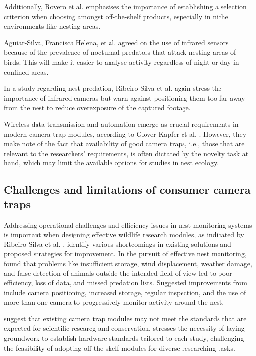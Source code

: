 \documentclass[class=report,11pt,crop=false]{standalone}
\begin{document}
Additionally, Rovero et al. \cite{rovero2013which} emphasises the importance of establishing a selection criterion when choosing amongst off-the-shelf products, especially in niche environments like nesting areas.

Aguiar-Silva, Francisca Helena, et al. \cite{aguiar-silva2017camera} agreed on the use of infrared sensors because of the prevalence of nocturnal predators that attack nesting areas of birds. This will make it easier to analyse activity regardless of night or day in confined areas.

In a study regarding nest predation, Ribeiro-Silva et al. \cite{ribeiro-silva2018testing} again stress the importance of infrared cameras but warn against positioning them too far away from the nest to reduce overexposure of the captured footage.

Wireless data transmission and automation emerge as crucial requirements in modern camera trap modules, according to Glover-Kapfer et al. \cite{glover2019camera}. However, they make note of the fact that availability of good camera traps, i.e., those that are relevant to the researchers’ requirements, is often dictated by the novelty task at hand, which may limit the available options for studies in nest ecology.  

\subsection{Challenges and limitations of consumer camera traps}

Addressing operational challenges and efficiency issues in nest monitoring systems is important when designing effective wildlife research modules, as indicated by Ribeiro-Silva  et al. \cite{ribeiro-silva2018testing}, identify various shortcomings in existing solutions and proposed strategies for improvement. In the pursuit of effective nest monitoring, \cite{ribeiro-silva2018testing} found that problems like insufficient storage, wind displacement, weather damage, and false detection of animals outside the intended field of view led to poor efficiency, loss of data, and missed predation lists. Suggested improvements from \cite{ribeiro-silva2018testing} include camera positioning, increased storage, regular inspection, and the use of more than one camera to progressively monitor activity around the nest. 

\cite{ahumada2020wildlife} suggest that existing camera trap modules may not meet the standards that are expected for scientific researcg and conservation. \cite{ahumada2020wildlife} stresses the necessity of laying groundwork to establish hardware standards tailored to each study, challenging the feasibility of adopting off-the-shelf modules for diverse researching tasks. 
\end{document}
